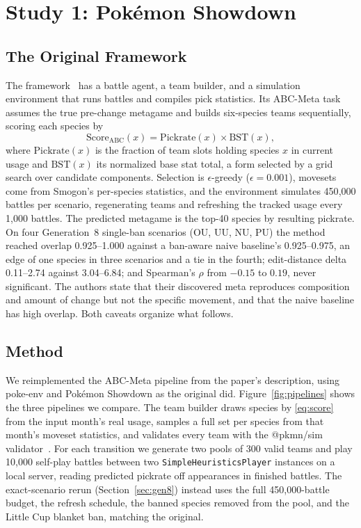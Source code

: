 \documentclass[journal]{IEEEtran}
\newcommand{\pkmn}{Pok\'emon}
\begin{document}
\section{Study 1: \pkmn{} Showdown}
\label{sec:pkmn}

\subsection{The Original Framework}

The framework~\cite{saravanan2024framework} has a battle agent, a team
builder, and a simulation environment that runs battles and compiles pick
statistics. Its ABC-Meta task assumes the true pre-change metagame and
builds six-species teams sequentially, scoring each species by
\begin{equation}
\mathrm{Score}_{\mathrm{ABC}}(x) = \mathrm{Pickrate}(x) \times \mathrm{BST}(x),
\label{eq:score}
\end{equation}
where $\mathrm{Pickrate}(x)$ is the fraction of team slots holding species
$x$ in current usage and $\mathrm{BST}(x)$ its normalized base stat total,
a form selected by a grid search over candidate components. Selection is
$\epsilon$-greedy ($\epsilon=0.001$), movesets come from Smogon's
per-species statistics, and the environment simulates 450{,}000 battles
per scenario, regenerating teams and refreshing the tracked usage every
1{,}000 battles. The predicted metagame is the top-40 species by resulting
pickrate. On four Generation~8 single-ban scenarios (OU, UU, NU, PU) the
method reached overlap 0.925--1.000 against a ban-aware naive baseline's
0.925--0.975, an edge of one species in three scenarios and a tie in the
fourth; edit-distance delta 0.11--2.74 against 3.04--6.84; and Spearman's
$\rho$ from $-0.15$ to $0.19$, never significant. The authors state that
their discovered meta reproduces composition and amount of change but not
the specific movement, and that the naive baseline has high overlap. Both
caveats organize what follows.

\subsection{Method}

We reimplemented the ABC-Meta pipeline from the paper's description,
using poke-env and \pkmn{} Showdown as the original did.
Figure~\ref{fig:pipelines} shows the three pipelines we compare. The team
builder draws species by \eqref{eq:score} from the input month's real
usage, samples a full set per species from that month's moveset
statistics, and validates every team with the @pkmn/sim
validator~\cite{pkmnps}. For each transition we generate two pools of 300
valid teams and play 10{,}000 self-play battles between two
\texttt{SimpleHeuristicsPlayer} instances on a local server, reading
predicted pickrate off appearances in finished battles. The exact-scenario
rerun (Section~\ref{sec:gen8}) instead uses the full 450{,}000-battle
budget, the refresh schedule, the banned species removed from the pool,
and the Little Cup blanket ban, matching the original.
\end{document}
